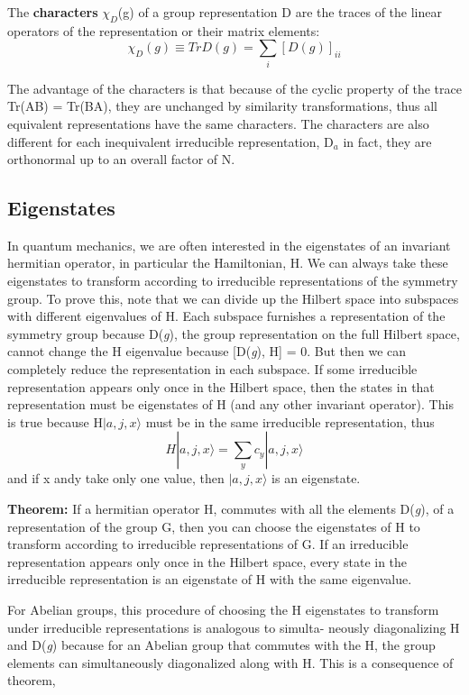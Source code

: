 The \textbf{characters} $\chi_D$(g) of a group representation D are the traces of the linear
operators of the representation or their matrix elements:
\begin{equation}
    \chi_D(g) \equiv Tr D(g) = \sum_{i}[D(g)]_{ii}
\end{equation}

The advantage of the characters is that because of the cyclic property of the trace Tr(AB) = Tr(BA), they are unchanged by similarity transformations,
thus all equivalent representations have the same characters. The characters are also different for each inequivalent irreducible representation, D$_a$\textemdash 
in fact, they are orthonormal up to an overall factor of N.

\subsection{Eigenstates}
In quantum mechanics, we are often interested in the eigenstates of an invariant hermitian operator, in particular the Hamiltonian, H. 
We can always take these eigenstates to transform according to irreducible representations of the symmetry group. 
To prove this, note that we can divide up the Hilbert space into subspaces with different eigenvalues of H. 
Each subspace furnishes a representation of the symmetry group because D(\textit{g}), the group representation on the full Hilbert space, 
cannot change the H eigenvalue because [D(\textit{g}), H] = 0. But then we can completely reduce the representation in each subspace.
If some irreducible representation appears only once in the Hilbert space, then the states in that representation must be eigenstates
of H (and any other invariant operator). This is true because H$|a, j, x\rangle$ must be in the same irreducible representation, thus
\begin{equation}
    H|a, j, x\rangle = \sum_{y} c_y |a, j, x\rangle
\end{equation}
and if x andy take only one value, then $|a, j, x\rangle$ is an eigenstate.

\textbf{Theorem:} If a hermitian operator H, commutes with all the elements D(\textit{g}), of a representation of the group G, 
then you can choose the eigenstates of H to transform according to irreducible representations of G. 
If an irreducible representation appears only once in the Hilbert space, every state in the irreducible representation 
is an eigenstate of H with the same eigenvalue.

For Abelian groups, this procedure of choosing the H eigenstates to transform under irreducible representations is analogous to simulta-
neously diagonalizing H and D(\textit{g}) because for an Abelian group that commutes with the H, the group elements can simultaneously
diagonalized along with H. This is a consequence of theorem,

